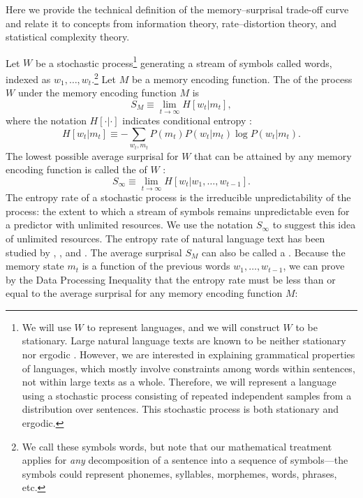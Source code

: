 Here we provide the technical definition of the memory--surprisal trade-off curve and relate it to concepts from information theory, rate--distortion theory, and statistical complexity theory. 

Let $W$ be a stochastic process\footnote{We will use $W$ to represent languages, and we will construct $W$ to be stationary. Large natural language texts are known to be neither stationary nor ergodic \citep{debowski}. However, we are interested in explaining grammatical properties of languages, which mostly involve constraints among words within sentences, not within large texts as a whole. Therefore, we will represent a language using a stochastic process consisting of repeated independent samples from a distribution over sentences. This stochastic process is both stationary and ergodic.} generating a stream of symbols called words, indexed as $w_1, \dots, w_t$.\footnote{We call these symbols words, but note that our mathematical treatment applies for \emph{any} decomposition of a sentence into a sequence of symbols---the symbols could represent phonemes, syllables, morphemes, words, phrases, etc.} Let $M$ be a memory encoding function. The  of the process $W$ under the memory encoding function $M$ is
\begin{equation}
    S_M \equiv \lim_{t \rightarrow \infty} H[w_t | m_t],
\end{equation}
where the notation $H[\cdot | \cdot]$ indicates conditional entropy \citep[][p. 17]{cover2006elements}:
\begin{equation}
    H[w_t|m_t] \equiv -\sum_{w_t,m_t} P(m_t) P(w_t|m_t) \log P(w_t|m_t).
\end{equation}
The lowest possible average surprisal for $W$ that can be attained by any memory encoding function is called the  of $W$ \citep[][pp. 74--75]{cover2006elements}:
\begin{equation}
    \label{eq:entropy-rate}
    S_\infty \equiv \lim_{t \rightarrow \infty} H[w_t | w_1, \dots, w_{t-1}].
\end{equation}
 The entropy rate of a stochastic process is the irreducible unpredictability of the process: the extent to which a stream of symbols remains unpredictable even for a predictor with unlimited resources. 
 We use the notation $S_\infty$ to suggest this idea of unlimited resources.
 The entropy rate of natural language text has been studied by \citet{shannon1951entropy}, \citet{takahira}, and \citet{bentz}. 
 The average surprisal $S_M$ can also be called a .  Because the memory state $m_t$ is a function of the previous words $w_1, \dots, w_{t-1}$, we can prove by the Data Processing Inequality \citep[][pp. 34--35]{cover2006elements} that the entropy rate must be less than or equal to the average surprisal for any memory encoding function $M$:
